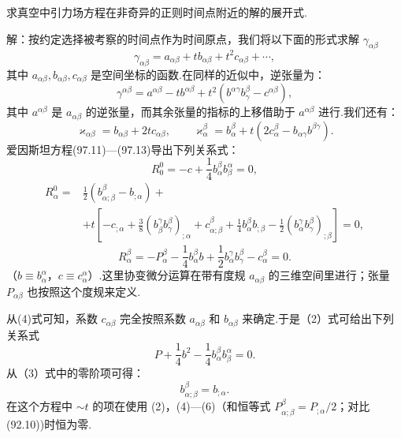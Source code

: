 \begin{xiti}

\quad 求真空中引力场方程在非奇异的正则时间点附近的解的展开式.

解：按约定选择被考察的时间点作为时间原点，我们将以下面的形式求解 $\gamma_{\alpha\beta}$
\begin{equation*}
  \gamma_{\alpha\beta}=a_{\alpha\beta}+tb_{\alpha\beta}
  +t^2c_{\alpha\beta}+\cdots,
\tag{1}\end{equation*}
其中 $a_{\alpha\beta},b_{\alpha\beta},c_{\alpha\beta}$ 是空间坐标的函数.在同样的近似中，逆张量为：
\begin{equation*}
  \gamma^{\alpha\beta}=a^{\alpha\beta}-tb^{\alpha\beta}
  +t^2\left(b^{\alpha\gamma}b_{\gamma}^{\beta}-c^{\alpha\beta}\right),
\end{equation*}
其中 $a^{\alpha\beta}$ 是 $a_{\alpha\beta}$ 的逆张量，而其余张量的指标的上移借助于 $a^{\alpha\beta}$ 进行.我们还有：
\begin{equation*}
  \varkappa_{\alpha\beta}=b_{\alpha\beta}+2tc_{\alpha\beta},\qquad
  \varkappa_{\alpha}^{\beta}=b_{\alpha}^{\beta}
  +t\left(2c_{\alpha}^{\beta}-b_{\alpha\gamma}b^{\beta\gamma}\right).
\end{equation*}
爱因斯坦方程(97.11)—(97.13)导出下列关系式：
\begin{equation*}
  R^0_0=-c+\frac{1}{4}b_{\alpha}^{\beta}b_{\beta}^{\alpha}=0,
\tag{2}\end{equation*}
\begin{equation*}
\begin{aligned}
  R^0_{\alpha}={}&\frac{1}{2}\left(b^{\beta}_{\alpha;\beta}-b_{;\alpha}\right)+{}\\
  &+t\left[-c_{;\alpha}
  +\frac{3}{8}\left(b_{\beta}^{\gamma}b_{\gamma}^{\beta}\right)_{;\alpha}
  +c^{\beta}_{\alpha;\beta}
  +\frac{1}{4}b_{\alpha}^{\beta}b_{;\beta}
  -\frac{1}{2}\left(b_{\alpha}^{\gamma}b_{\gamma}^{\beta}\right)_{;\beta}\right]=0,
\end{aligned}
\tag{3}\end{equation*}
\begin{equation*}
  R^{\beta}_{\alpha}=-P^{\beta}_{\alpha}
  -\frac{1}{4}b_{\alpha}^{\beta}b
  +\frac{1}{2}b_{\alpha}^{\gamma}b_{\gamma}^{\beta}
  -c_{\alpha}^{\beta}=0.
\tag{4}\end{equation*}
（$b\equiv b_{\alpha}^{\alpha}$，$c\equiv c_{\alpha}^{\alpha}$）.这里协变微分运算在带有度规 $a_{\alpha\beta}$ 的三维空间里进行；张量 $P_{\alpha\beta}$ 也按照这个度规来定义.

从(4)式可知，系数 $c_{\alpha\beta}$ 完全按照系数 $a_{\alpha\beta}$ 和 $b_{\alpha\beta}$ 来确定.于是（2）式可给出下列关系式
\begin{equation*}
  P+\frac{1}{4}b^2-\frac{1}{4}b_{\alpha}^{\beta}b_{\beta}^{\alpha}=0.
\tag{5}\end{equation*}
从（3）式中的零阶项可得：
\begin{equation*}
  b^{\beta}_{\alpha;\beta}=b_{;\alpha}.
\tag{6}\end{equation*}
在这个方程中 $\sim t$ 的项在使用 (2)，(4)—(6)（和恒等式 $P^{\beta}_{\alpha;\beta}=P_{;\alpha}/2$；对比(92.10))时恒为零.


\end{xiti}
